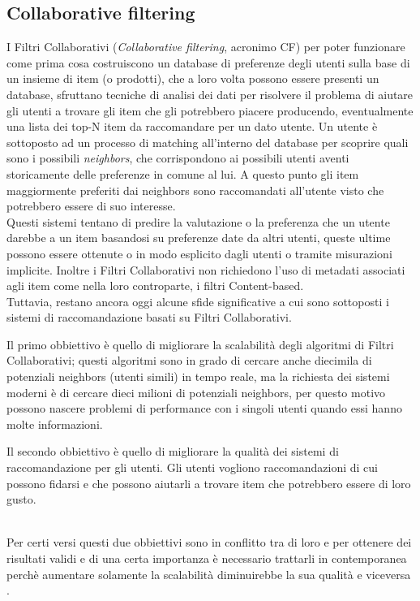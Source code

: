 \subsection{Collaborative filtering}
I Filtri Collaborativi (\textit{Collaborative filtering}, acronimo CF) per poter funzionare come prima cosa costruiscono un database di preferenze 
degli utenti sulla base di un insieme di item (o prodotti), che a loro volta possono essere presenti un database,
sfruttano tecniche di analisi dei dati per risolvere il problema di aiutare gli utenti a trovare gli item che gli potrebbero piacere 
producendo, eventualmente una lista dei top-N item da raccomandare per un dato utente.
Un utente è sottoposto ad un processo di matching all'interno del database per scoprire quali sono i possibili \textit{neighbors},
che corrispondono ai possibili utenti aventi storicamente delle preferenze in comune al lui. A questo punto gli item maggiormente 
preferiti dai neighbors sono raccomandati all'utente visto che potrebbero essere di suo interesse.\\ 
Questi sistemi tentano di predire la valutazione o la preferenza che un utente darebbe a un item basandosi su preferenze date da altri 
utenti, queste ultime possono essere ottenute o in modo esplicito dagli utenti o tramite misurazioni implicite. 
Inoltre i Filtri Collaborativi non richiedono l'uso di metadati associati agli item come nella loro controparte, i filtri Content-based.\\

Tuttavia, restano ancora oggi alcune sfide significative a cui sono sottoposti i sistemi di raccomandazione basati su 
Filtri Collaborativi.
\begin{description}
	\item Il primo obbiettivo è quello di migliorare la scalabilità degli algoritmi di Filtri Collaborativi; questi algoritmi sono in grado di cercare
	anche diecimila di potenziali neighbors (utenti simili) in tempo reale, ma la richiesta dei sistemi moderni è di cercare dieci milioni di 
	potenziali neighbors, per questo motivo possono nascere problemi di performance con i singoli utenti quando essi hanno molte informazioni.
	\item Il secondo obbiettivo è quello di migliorare la qualità dei sistemi di raccomandazione per gli utenti. Gli utenti vogliono
	raccomandazioni di cui possono fidarsi e che possono aiutarli a trovare item che potrebbero essere di loro gusto.
\end{description}
\ \\
Per certi versi questi due obbiettivi sono in conflitto tra di loro e per ottenere dei risultati validi e di una certa importanza è 
necessario trattarli in contemporanea perchè aumentare solamente la scalabilità diminuirebbe la sua qualità e viceversa 
\cite{item-based-collaborative-filtering}.\\


